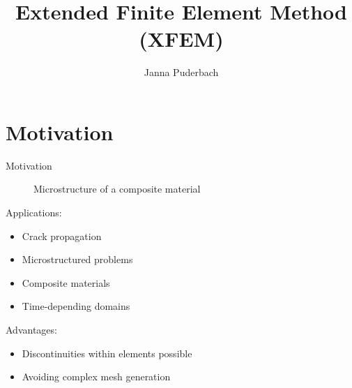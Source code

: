 \documentclass[10pt]{beamer}	%
\title{Extended Finite Element Method (XFEM)}
\author{Janna Puderbach}
\begin{document}
    \addtocounter{framenumber}{-1}	%
   	\begin{frame}[plain]
		\titlepage
	\end{frame}

\section{Motivation}

\begin{frame}{Motivation}
    \begin{figure}
        \caption{Microstructure of a composite material}
    \end{figure}
	Applications:
	\begin{itemize}
        \item Crack propagation
        \item Microstructured problems
        \item Composite materials
        \item Time-depending domains
	\end{itemize}
    Advantages:
    \begin{itemize}
        \item Discontinuities within elements possible
        \item Avoiding complex mesh generation
    \end{itemize}
\end{frame}
	
\end{document}
